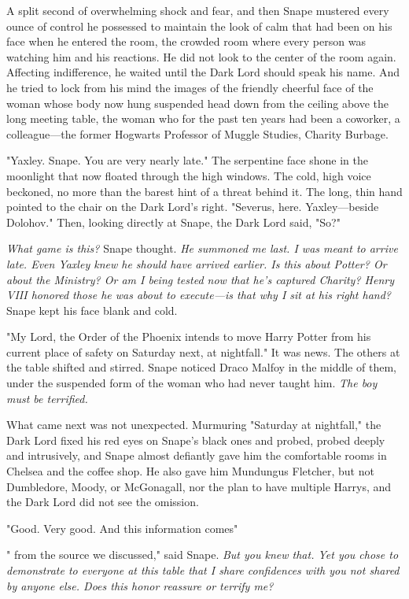 A split second of overwhelming shock and fear, and then Snape mustered every ounce of control he possessed to maintain the look of calm that had been on his face when he entered the room, the crowded room where every person was watching him and his reactions. He did not look to the center of the room again. Affecting indifference, he waited until the Dark Lord should speak his name. And he tried to lock from his mind the images of the friendly cheerful face of the woman whose body now hung suspended head down from the ceiling above the long meeting table, the woman who for the past ten years had been a coworker, a colleague—the former Hogwarts Professor of Muggle Studies, Charity Burbage.

"Yaxley. Snape. You are very nearly late." The serpentine face shone in the moonlight that now floated through the high windows. The cold, high voice beckoned, no more than the barest hint of a threat behind it. The long, thin hand pointed to the chair on the Dark Lord's right. "Severus, here. Yaxley—beside Dolohov." Then, looking directly at Snape, the Dark Lord said, "So?"

\emph{What game is this?} Snape thought. \emph{He summoned me last. I was meant to arrive late. Even Yaxley knew he should have arrived earlier. Is this about Potter? Or about the Ministry? Or am I being tested now that he's captured Charity? Henry VIII honored those he was about to execute—is that why I sit at his right hand?} Snape kept his face blank and cold.

"My Lord, the Order of the Phoenix intends to move Harry Potter from his current place of safety on Saturday next, at nightfall." It was news. The others at the table shifted and stirred. Snape noticed Draco Malfoy in the middle of them, under the suspended form of the woman who had never taught him. \emph{The boy must be terrified.}

What came next was not unexpected. Murmuring "Saturday{\el} at nightfall," the Dark Lord fixed his red eyes on Snape's black ones and probed, probed deeply and intrusively, and Snape almost defiantly gave him the comfortable rooms in Chelsea and the coffee shop. He also gave him Mundungus Fletcher, but not Dumbledore, Moody, or McGonagall, nor the plan to have multiple Harrys, and the Dark Lord did not see the omission.

"Good. Very good. And this information comes{\el}"

"{\el} from the source we discussed," said Snape. \emph{But you knew that. Yet you chose to demonstrate to everyone at this table that I share confidences with you not shared by anyone else. Does this honor reassure or terrify me?}

